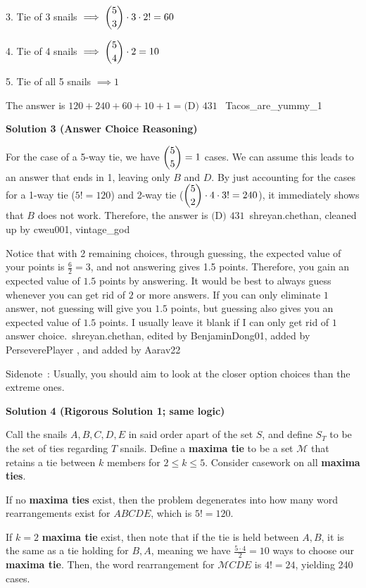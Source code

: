 \begin{enumerate}
 3. Tie of 3 snails $\implies\dbinom{5}{3}\cdot3\cdot2!=60$

 4. Tie of 4 snails $\implies\dbinom{5}{4}\cdot2=10$

 5. Tie of all 5 snails $\implies1$

 The answer is $120+240+60+10+1=\boxed{\text{(D) }431}$ ~Tacos\_are\_yummy\_1

 



\textbf{Solution 3 (Answer Choice Reasoning)}

For the case of a 5-way tie, we have $\dbinom{5}{5}=1$ cases. We can assume this leads to an answer that ends in 1, leaving only $B$ and $D$. By just accounting for the cases for a 1-way tie ($5!=120$) and 2-way tie ($\dbinom{5}{2}\cdot4\cdot3!=240$), it immediately shows that $B$ does not work. Therefore, the answer is $\boxed{\text{(D) }431}$~shreyan.chethan, cleaned up by cweu001, vintage\_god

 Notice that with 2 remaining choices, through guessing, the expected value of your points is $\frac{6}{2}=3$, and not answering gives 1.5 points. Therefore, you gain an expected value of $1.5$ points by answering. It would be best to always guess whenever you can get rid of $2$ or more answers. If you can only eliminate $1$ answer, not guessing will give you $1.5$ points, but guessing also gives you an expected value of $1.5$ points. I usually leave it blank if I can only get rid of $1$ answer choice.~shreyan.chethan, edited by BenjaminDong01, added by PerseverePlayer , and added by Aarav22

 Sidenote : Usually, you should aim to look at the closer option choices than the extreme ones.

 



\textbf{Solution 4 (Rigorous Solution 1; same logic)}

Call the snails $A,B,C,D,E$ in said order apart of the set $S$, and define $S_{T}$ to be the set of ties regarding $T$ snails. Define a \textbf{maxima tie} to be a set $\mathcal{M}$ that retains a tie between $k$ members for $2 \le k \le 5$. Consider casework on all \textbf{maxima ties}.

 If no \textbf{maxima ties} exist, then the problem degenerates into how many word rearrangements exist for $ABCDE$, which is $5! = 120$.

 If $k=2$ \textbf{maxima tie} exist, then note that if the tie is held between $A,B$, it is the same as a tie holding for $B,A$, meaning we have $\frac{5 \cdot 4}{2} = 10$ ways to choose our \textbf{maxima tie}. Then, the word rearrangement for $\mathcal{M}CDE$ is $4! = 24$, yielding 240 cases.


\end{enumerate}
